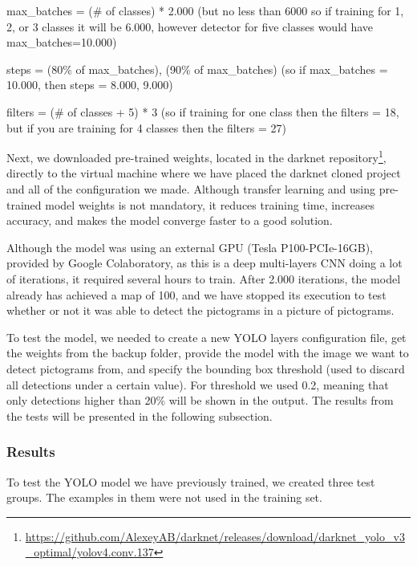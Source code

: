 max\_batches = (\# of classes) * 2.000 (but no less than 6000 so if training for 1, 2, or 3 classes it will be 6.000, however detector for five classes would have max\_batches=10.000)

steps = (80\% of max\_batches), (90\% of max\_batches) (so if max\_batches = 10.000, then steps = 8.000, 9.000)

filters = (\# of classes + 5) * 3 (so if training for one class then the filters = 18, but if you are training for 4 classes then the filters = 27)\hfill \break

Next, we downloaded pre-trained weights, located in the darknet repository\footnote{\href{https://github.com/AlexeyAB/darknet/releases/download/darknet_yolo_v3_optimal/yolov4.conv.137}{https://github.com/AlexeyAB/darknet/releases/download/darknet\_yolo\_v3\_optimal/yolov4.conv.137}},  directly to the virtual machine where we have placed the darknet cloned project and all of the configuration we made. Although transfer learning and using pre-trained model weights is not mandatory, it reduces training time, increases accuracy, and makes the model converge faster to a good solution.

Although the model was using an external GPU (Tesla P100-PCIe-16GB), provided by Google Colaboratory, as this is a deep multi-layers CNN doing a lot of iterations, it required several hours to train. After 2.000 iterations, the model already has achieved a map of 100, and we have stopped its execution to test whether or not it was able to detect the pictograms in a picture of pictograms.

To test the model, we needed to create a new YOLO layers configuration file, get the weights from the backup folder, provide the model with the image we want to detect pictograms from, and specify the bounding box threshold (used to discard all detections under a certain value). For threshold we used 0.2, meaning that only detections higher than 20\% will be shown in the output. The results from the tests will be presented in the following subsection.


\subsubsection{Results}

To test the YOLO model we have previously trained, we created three test groups. The examples in them were not used in the training set.

